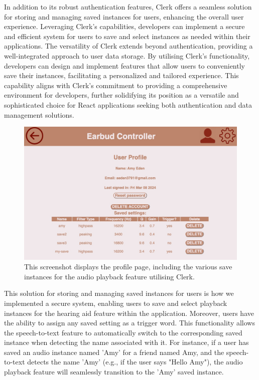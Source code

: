 \documentclass{l4proj}
\begin{document}
In addition to its robust authentication features, Clerk offers a seamless solution for storing and managing saved instances for users, enhancing the overall user experience. Leveraging Clerk's capabilities, developers can implement a secure and efficient system for users to save and select instances as needed within their applications. The versatility of Clerk extends beyond authentication, providing a well-integrated approach to user data storage. By utilising Clerk's functionality, developers can design and implement features that allow users to conveniently save their instances, facilitating a personalized and tailored experience. This capability aligns with Clerk's commitment to providing a comprehensive environment for developers, further solidifying its position as a versatile and sophisticated choice for React applications seeking both authentication and data management solutions.

\begin{figure}
    \centering
    \includegraphics[width=0.9\linewidth]{dissertation/images/profile.jpeg} 
    \caption{This screenshot displays the profile page, including the various save instances for the audio playback feature utilising Clerk.}
    \label{fig:profile} 
\end{figure}

This solution for storing and managing saved instances for users is how we implemented a secure system, enabling users to save and select playback instances for the hearing aid feature within the application. Moreover, users have the ability to assign any saved setting as a trigger word. This functionality allows the speech-to-text feature to automatically switch to the corresponding saved instance when detecting the name associated with it. For instance, if a user has saved an audio instance named 'Amy' for a friend named Amy, and the speech-to-text detects the name 'Amy' (e.g., if the user says "Hello Amy"), the audio playback feature will seamlessly transition to the 'Amy' saved instance.
\end{document}
